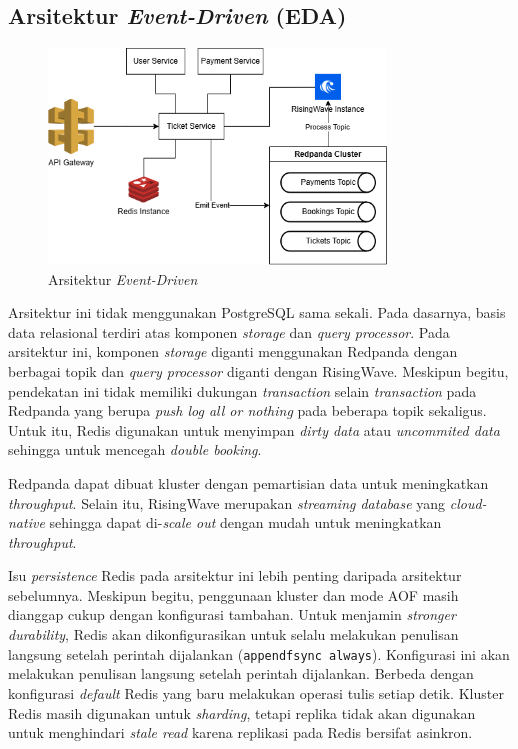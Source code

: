 \subsection{Arsitektur \textit{Event-Driven} (EDA)}

\begin{figure}[htbp]
    \centering
    \includegraphics[width=0.8\textwidth]{resources/appendix/architecture-event-driven.png}
    \caption{Arsitektur \textit{Event-Driven}}
    \label{fig:solution-event-driven-architecture}
\end{figure}

Arsitektur ini tidak menggunakan PostgreSQL sama sekali. Pada dasarnya, basis data relasional terdiri atas komponen \textit{storage} dan \textit{query processor}. Pada arsitektur ini, komponen \textit{storage} diganti menggunakan Redpanda dengan berbagai topik dan \textit{query processor} diganti dengan RisingWave. Meskipun begitu, pendekatan ini tidak memiliki dukungan \textit{transaction} selain \textit{transaction} pada Redpanda yang berupa \textit{push log all or nothing} pada beberapa topik sekaligus. Untuk itu, Redis digunakan untuk menyimpan \textit{dirty data} atau \textit{uncommited data} sehingga untuk mencegah \textit{double booking}.

Redpanda dapat dibuat kluster dengan pemartisian data untuk meningkatkan \textit{throughput}. Selain itu, RisingWave merupakan \textit{streaming database} yang \textit{cloud-native} sehingga dapat di-\textit{scale out} dengan mudah untuk meningkatkan \textit{throughput}.

Isu \textit{persistence} Redis pada arsitektur ini lebih penting daripada arsitektur sebelumnya. Meskipun begitu, penggunaan kluster dan mode AOF masih dianggap cukup dengan konfigurasi tambahan. Untuk menjamin \textit{stronger durability}, Redis akan dikonfigurasikan untuk selalu melakukan penulisan langsung setelah perintah dijalankan (\texttt{appendfsync always}). Konfigurasi ini akan melakukan penulisan langsung setelah perintah dijalankan. Berbeda dengan konfigurasi \textit{default} Redis yang baru melakukan operasi tulis setiap detik. Kluster Redis masih digunakan untuk \textit{sharding}, tetapi replika tidak akan digunakan untuk menghindari \textit{stale read} karena replikasi pada Redis bersifat asinkron.

